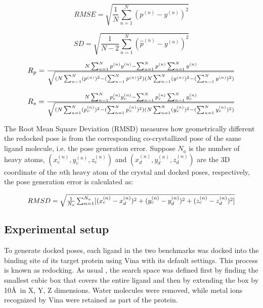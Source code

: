 \documentclass[twocolumn]{bmcart}
\begin{document}
\begin{equation}
RMSE = \sqrt{\frac{1}{N}\sum_{n=1}^N(p^{(n)}-y^{(n)})^2}
\label{rescoring2:rmse}
\end{equation}

\begin{equation}
SD = \sqrt{\frac{1}{N-2}\sum_{n=1}^N(\hat{p}^{(n)}-y^{(n)})^2}
\label{rescoring2:sdev}
\end{equation}

\begin{equation}
\resizebox{.85\hsize}{!}{$R_p = \frac{N\sum_{n=1}^Np^{(n)}y^{(n)}-\sum_{n=1}^Np^{(n)}\sum_{n=1}^Ny^{(n)}}{\sqrt{(N\sum_{n=1}^N(p^{(n)})^2-(\sum_{n=1}^Np^{(n)})^2)(N\sum_{n=1}^N(y^{(n)})^2-(\sum_{n=1}^Ny^{(n)})^2)}}$}
\label{rescoring2:pcor}
\end{equation}

\begin{equation}
\resizebox{.85\hsize}{!}{$R_s = \frac{N\sum_{n=1}^Np_r^{(n)}y_r^{(n)}-\sum_{n=1}^Np_r^{(n)}\sum_{n=1}^Ny_r^{(n)}}{\sqrt{(N\sum_{n=1}^N(p_r^{(n)})^2-(\sum_{n=1}^Np_r^{(n)})^2)(N\sum_{n=1}^N(y_r^{(n)})^2-(\sum_{n=1}^Ny_r^{(n)})^2)}}$}
\label{rescoring2:scor}
\end{equation}

The Root Mean Square Deviation (RMSD) measures how geometrically different the redocked pose is from the corresponding co-crystallized pose of the same ligand molecule, i.e. the pose generation error. Suppose $N_a$ is the number of heavy atoms, $(x_c^{(n)}, y_c^{(n)}, z_c^{(n)})$ and $(x_d^{(n)}, y_d^{(n)}, z_d^{(n)})$ are the 3D coordinate of the $n$th heavy atom of the crystal and docked poses, respectively, the pose generation error is calculated as:

\begin{equation}
\resizebox{.85\hsize}{!}{$RMSD = \sqrt{\frac{1}{N_a}\sum_{n=1}^{N_a}[(x_c^{(n)}-x_d^{(n)})^2+(y_c^{(n)}-y_d^{(n)})^2+(z_c^{(n)}-z_d^{(n)})^2]}$}
\label{rescoring2:rmsd}
\end{equation}

\subsection*{Experimental setup}

To generate docked poses, each ligand in the two benchmarks was docked into the binding site of its target protein using Vina with its default settings. This process is known as redocking. As usual \cite{1362}, the search space was defined first by finding the smallest cubic box that covers the entire ligand and then by extending the box by 10\AA\ in X, Y, Z dimensions. Water molecules were removed, while metal ions recognized by Vina were retained as part of the protein. 
\end{document}
